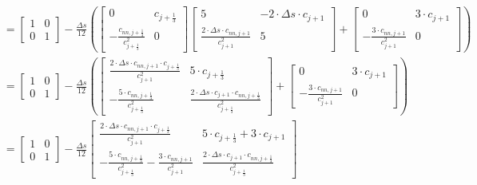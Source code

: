 \documentclass{article}
\begin{document}
\begin{align*}
	                                                 & = \begin{bmatrix} 1 & 0 \\ 0 & 1 \end{bmatrix} - \frac{\Delta s}{12}\left(\begin{bmatrix} 0 & c_{j+\frac{1}{3}} \\ -\frac{c_{nn, j+\frac{1}{3}}}{c_{j+\frac{1}{3}}^2} & 0 \end{bmatrix}\begin{bmatrix}  5 & -2\cdot\Delta s\cdot c_{j+1} \\ \frac{2\cdot\Delta s\cdot c_{nn, j+1}}{c_{j+1}^2} & 5\end{bmatrix} + \begin{bmatrix} 0 & 3\cdot c_{j+1} \\ -\frac{3\cdot c_{nn, j+1}}{c_{j+1}^2} & 0\end{bmatrix}\right)                                                                                                              \\
	                                                 & = \begin{bmatrix} 1 & 0 \\ 0 & 1 \end{bmatrix} - \frac{\Delta s}{12}\left(\begin{bmatrix} \frac{2\cdot\Delta s\cdot c_{nn, j+1}\cdot c_{j+\frac{1}{3}}}{c_{j+1}^2} & 5\cdot c_{j+\frac{1}{3}} \\ -\frac{5\cdot c_{nn, j+\frac{1}{3}}}{c_{j+\frac{1}{3}}^2} & \frac{2\cdot\Delta s\cdot c_{j+1}\cdot c_{nn, j+\frac{1}{3}}}{c_{j+\frac{1}{3}}^2} \end{bmatrix} + \begin{bmatrix} 0 & 3\cdot c_{j+1} \\ -\frac{3\cdot c_{nn, j+1}}{c_{j+1}^2} & 0\end{bmatrix}\right) \\
	                                                 & = \begin{bmatrix} 1 & 0 \\ 0 & 1 \end{bmatrix} - \frac{\Delta s}{12}\begin{bmatrix} \frac{2\cdot\Delta s\cdot c_{nn, j+1}\cdot c_{j+\frac{1}{3}}}{c_{j+1}^2} & 5\cdot c_{j+\frac{1}{3}} + 3\cdot c_{j+1} \\ -\frac{5\cdot c_{nn, j+\frac{1}{3}}}{c_{j+\frac{1}{3}}^2} - \frac{3\cdot c_{nn, j+1}}{c_{j+1}^2} & \frac{2\cdot\Delta s\cdot c_{j+1}\cdot c_{nn, j+\frac{1}{3}}}{c_{j+\frac{1}{3}}^2} \end{bmatrix}                                                     \\

\end{align*}
\end{document}
